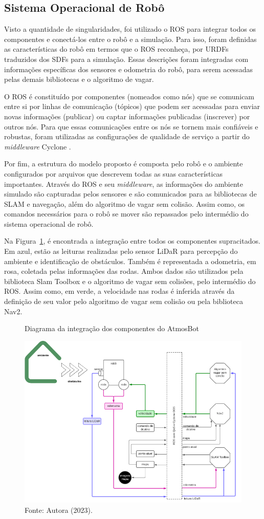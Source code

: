 \subsection{Sistema Operacional de Robô}

Visto a quantidade de singularidades, foi utilizado o ROS para integrar todos os componentes e conectá-los entre o robô e a simulação. Para isso, foram definidas as características do robô em termos que o ROS reconheça, por URDFs traduzidos dos SDFs para a simulação. Essas descrições foram integradas com informações específicas dos sensores e odometria do robô, para serem acessadas pelas demais bibliotecas e o algoritmo de vagar.

O ROS é constituído por componentes (nomeados como nós) que se comunicam entre si por linhas de comunicação (tópicos) que podem ser acessadas para enviar novas informações (publicar) ou captar informações publicadas (inscrever) por outros nós. Para que essas comunicações entre os nós se tornem mais confiáveis e robustas, foram utilizadas as configurações de qualidade de serviço  a partir do \textit{middleware} Cyclone \cite{qos, cyclone}.

Por fim, a estrutura do modelo proposto é composta pelo robô e o ambiente configurados por arquivos que descrevem todas as suas características importantes. Através do ROS e seu \textit{middleware}, as informações do ambiente simulado são capturadas pelos sensores e são comunicados para as bibliotecas de SLAM e navegação, além do algoritmo de vagar sem colisão. Assim como, os comandos necessários para o robô se mover são repassados pelo intermédio do sistema operacional de robô.

Na Figura~\ref{fig:diagramaBlocosDetalhado}, é encontrada a integração entre todos os componentes supracitados. Em azul, estão as leituras realizadas pelo sensor LiDaR para percepção do ambiente e identificação de obstáculos. Também é representada a odometria, em rosa, coletada pelas informações das rodas. Ambos dados são utilizados pela biblioteca Slam Toolbox e o algoritmo de vagar sem colisões, pelo intermédio do ROS. Assim como, em verde, a velocidade nas rodas é inferida através da definição de seu valor pelo algoritmo de vagar sem colisão ou pela biblioteca Nav2.

\begin{figure}[h]
    \centering
    \caption{Diagrama da integração dos componentes do AtmosBot}
    \includegraphics[scale=0.6]{diagramaBlocosDetalhado.png}
    
    \caption*{Fonte: Autora (2023).}
    \label{fig:diagramaBlocosDetalhado}
\end{figure}